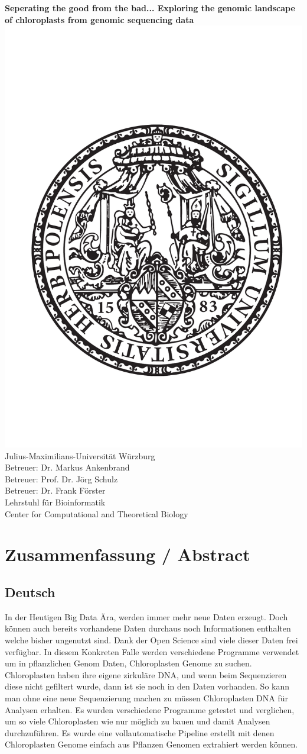 \documentclass{scrartcl}
\begin{document}
\begin{center}
\textbf{Seperating the good from the bad... Exploring the genomic landscape of chloroplasts from genomic sequencing data}
\includegraphics[width=.5\linewidth]{./neuSIEGEL.pdf}\\[1cm]
{\large Julius-Maximilians-Universität Würzburg}\\
{\large Betreuer: Dr. Markus Ankenbrand}\\
{\large Betreuer: Prof. Dr. Jörg Schulz}\\
{\large Betreuer: Dr. Frank Förster}\\
{\large Lehrstuhl für Bioinformatik}\\
{\large Center for Computational and Theoretical Biology}
\setcounter{page}{1}
\clearpage
\end{center}
\tableofcontents
\clearpage
\section{Zusammenfassung / Abstract}
\label{sec-1}
\subsection{Deutsch}
\label{sec-1-1}
In der Heutigen Big Data Ära, werden immer mehr neue Daten erzeugt. Doch können auch bereits vorhandene Daten durchaus noch Informationen enthalten welche bisher ungenutzt sind.
Dank der Open Science sind viele dieser Daten frei verfügbar. In diesem Konkreten Falle werden verschiedene Programme verwendet um in pflanzlichen Genom Daten, Chloroplasten Genome zu 
suchen. Chloroplasten haben ihre eigene zirkuläre DNA, und wenn beim Sequenzieren diese nicht gefiltert wurde, dann ist sie noch in den Daten vorhanden. So kann man ohne 
eine neue Sequenzierung machen zu müssen Chloroplasten DNA für Analysen erhalten. Es wurden verschiedene Programme getestet und verglichen, um so viele Chloroplasten 
wie nur möglich zu bauen und damit Analysen durchzuführen. Es wurde eine vollautomatische Pipeline erstellt mit denen Chloroplasten Genome einfach aus Pflanzen Genomen
extrahiert werden können. 
\end{document}
